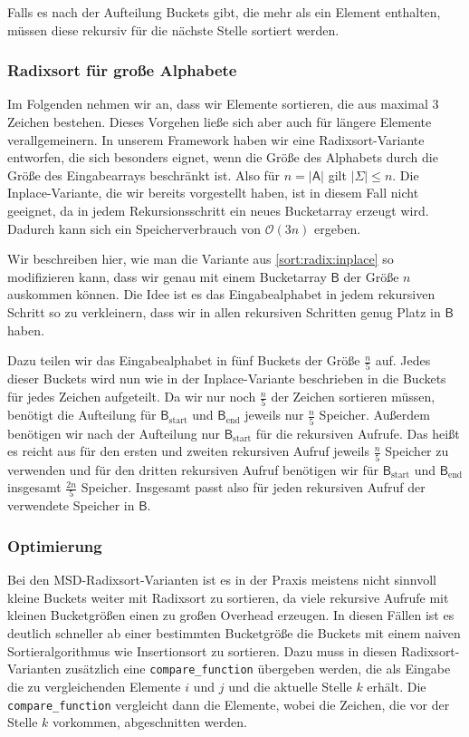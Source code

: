 Falls es nach der Aufteilung Buckets gibt, die mehr als ein Element enthalten,
müssen diese rekursiv für die nächste Stelle sortiert werden.

\subsubsection{Radixsort für große Alphabete}
\label{sort:radix:big_alph}

Im Folgenden nehmen wir an, dass wir Elemente sortieren,
die aus maximal $3$ Zeichen bestehen. Dieses Vorgehen ließe sich aber auch für längere Elemente verallgemeinern.
In unserem Framework haben wir eine Radixsort-Variante entworfen, die sich besonders eignet,
wenn die Größe des Alphabets durch die Größe des Eingabearrays beschränkt ist.
Also für $n=|\mathsf{A}|$ gilt $|\Sigma| \le n$. Die Inplace-Variante, die wir bereits vorgestellt haben,
ist in diesem Fall nicht geeignet, da in jedem Rekursionsschritt ein neues Bucketarray erzeugt wird.
Dadurch kann sich ein Speicherverbrauch von $\mathcal O(3n)$ ergeben.

Wir beschreiben hier, wie man die Variante aus \cref{sort:radix:inplace} so modifizieren kann,
dass wir genau mit einem Bucketarray $\mathsf{B}$ der Größe $n$ auskommen können.
Die Idee ist es das Eingabealphabet in jedem rekursiven Schritt so zu verkleinern,
dass wir in allen rekursiven Schritten genug Platz in $\mathsf{B}$ haben.

Dazu teilen wir das Eingabealphabet in fünf Buckets der Größe $\frac{n}{5}$ auf.
Jedes dieser Buckets wird nun wie in der Inplace-Variante beschrieben in die Buckets für jedes Zeichen aufgeteilt.
Da wir nur noch $\frac{n}{5}$ der Zeichen sortieren müssen,
benötigt die Aufteilung für $\mathsf{B}_{\text{start}}$ und $\mathsf{B}_{\text{end}}$ jeweils nur $\frac{n}{5}$ Speicher.
Außerdem benötigen wir nach der Aufteilung nur $\mathsf{B}_{\text{start}}$ für die rekursiven Aufrufe.
Das heißt es reicht aus für den ersten und zweiten rekursiven Aufruf jeweils $\frac{n}{5}$ Speicher zu verwenden
und für den dritten rekursiven Aufruf benötigen wir für $\mathsf{B}_{\text{start}}$ und $\mathsf{B}_{\text{end}}$
insgesamt $\frac{2n}{5}$ Speicher. Insgesamt passt also für jeden rekursiven Aufruf der verwendete Speicher in $\mathsf{B}$.

\subsubsection{Optimierung}

Bei den MSD-Radixsort-Varianten ist es in der Praxis meistens nicht sinnvoll kleine Buckets
weiter mit Radixsort zu sortieren, da viele rekursive Aufrufe mit kleinen Bucketgrößen einen zu großen Overhead erzeugen.
In diesen Fällen ist es deutlich schneller ab einer bestimmten Bucketgröße die Buckets mit einem
naiven Sortieralgorithmus wie Insertionsort zu sortieren.
Dazu muss in diesen Radixsort-Varianten zusätzlich eine \texttt{compare\_function} übergeben werden,
die als Eingabe die zu vergleichenden Elemente $i$ und $j$ und die aktuelle Stelle $k$ erhält.
Die \texttt{compare\_function} vergleicht dann die Elemente, wobei die Zeichen, die vor der Stelle $k$ vorkommen,
abgeschnitten werden.
